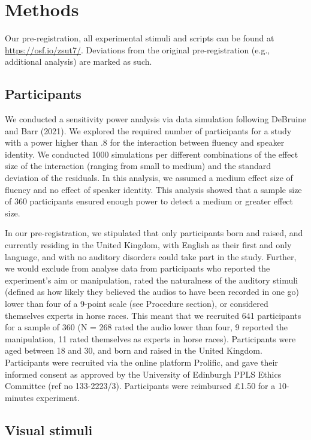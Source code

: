\documentclass[
  man,floatsintext]{apa7}
\begin{document}
\hypertarget{methods}{%
\section{Methods}\label{methods}}

Our pre-registration, all experimental stimuli and scripts can be found at \url{https://osf.io/zsut7/}. Deviations from the original pre-registration (e.g., additional analysis) are marked as such.

\hypertarget{participants}{%
\subsection{Participants}\label{participants}}

We conducted a sensitivity power analysis via data simulation following DeBruine and Barr (2021). We explored the required number of participants for a study with a power higher than .8 for the interaction between fluency and speaker identity. We conducted 1000 simulations per different combinations of the effect size of the interaction (ranging from small to medium) and the standard deviation of the residuals. In this analysis, we assumed a medium effect size of fluency and no effect of speaker identity. This analysis showed that a sample size of 360 participants ensured enough power to detect a medium or greater effect size.

In our pre-registration, we stipulated that only participants born and raised, and currently residing in the United Kingdom, with English as their first and only language, and with no auditory disorders could take part in the study. Further, we would exclude from analyse data from participants who reported the experiment's aim or manipulation, rated the naturalness of the auditory stimuli (defined as how likely they believed the audios to have been recorded in one go) lower than four of a 9-point scale (see Procedure section), or considered themselves experts in horse races. This meant that we recruited 641 participants for a sample of 360 (N = 268 rated the audio lower than four, 9 reported the manipulation, 11 rated themselves as experts in horse races). Participants were aged between 18 and 30, and born and raised in the United Kingdom. Participants were recruited via the online platform Prolific, and gave their informed consent as approved by the University of Edinburgh PPLS Ethics Committee (ref no 133-2223/3). Participants were reimbursed £1.50 for a 10-minutes experiment.

\hypertarget{visual-stimuli}{%
\subsection{Visual stimuli}\label{visual-stimuli}}
\end{document}
